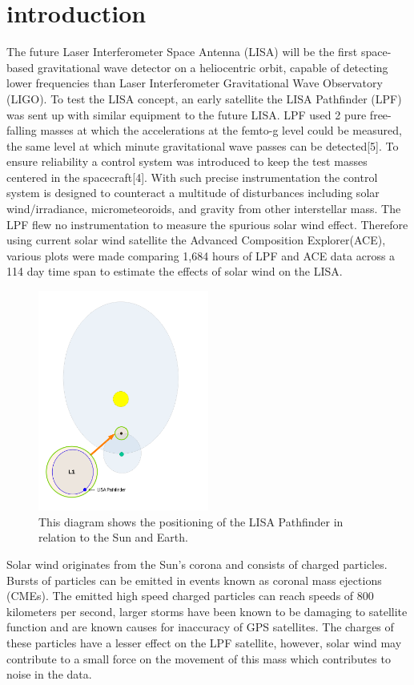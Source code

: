 \documentclass[%
 reprint,
 amsmath,amssymb,
 aps,
]{revtex4-2}
\begin{document}
\section{introduction}
The future Laser Interferometer Space Antenna (LISA) will be the first space-based gravitational wave detector on a heliocentric orbit, capable of detecting lower frequencies than Laser Interferometer Gravitational Wave Observatory (LIGO). To test the LISA concept, an early satellite the LISA Pathfinder (LPF) was sent up with similar equipment to the future LISA. LPF used 2 pure free-falling masses at which the accelerations at the femto-g level could be measured, the same level at which minute gravitational wave passes can be detected[5]. To ensure reliability a control system was introduced to keep the test masses centered in the spacecraft[4]. With such precise instrumentation the control system is designed to counteract a multitude of disturbances including solar wind/irradiance, micrometeoroids, and gravity from other interstellar mass. The LPF flew no instrumentation to measure the spurious solar wind effect. Therefore using current solar wind satellite the Advanced Composition Explorer(ACE), various plots were made comparing 1,684 hours of LPF and ACE data across a 114 day time span to estimate the effects of solar wind on the LISA.\\

\begin{figure}[htbp]
\centerline{\includegraphics[width=0.5\textwidth]{pathfinder_orbit_model-1.png}}
\caption{This diagram shows the positioning of the LISA Pathfinder in relation to the Sun and Earth.}
\label{fig}
\end{figure}

Solar wind originates from the Sun's corona and consists of charged particles. Bursts of particles can be emitted in events known as coronal mass ejections (CMEs). The emitted high speed charged particles can reach speeds of 800 kilometers per second, larger storms have been known to be damaging to satellite function and are known causes for inaccuracy of GPS satellites. The charges of these particles have a lesser effect on the LPF satellite, however, solar wind may contribute to a small force on the movement of this mass which contributes to noise in the data.\\
\end{document}
